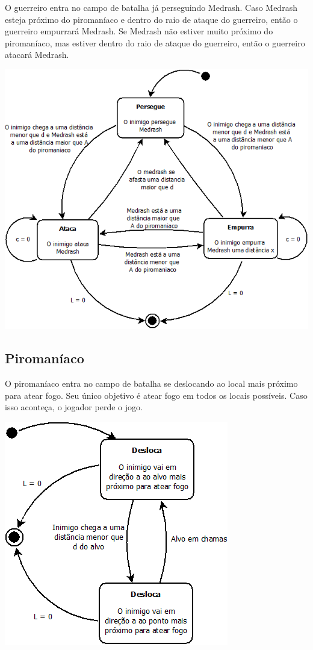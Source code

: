 O guerreiro entra no campo de batalha já perseguindo Medrash. Caso
Medrash esteja próximo do piromaníaco e dentro do raio de ataque do 
guerreiro, então o guerreiro empurrará Medrash.
Se Medrash não estiver muito próximo do piromaníaco, mas estiver dentro
do raio de ataque do guerreiro, então o guerreiro atacará Medrash.

\begin{center}
 \includegraphics[scale=0.5]{ia_guerreiro.png}
\end{center}

\subsection{Piromaníaco}

O piromaníaco entra no campo de batalha se deslocando ao local mais
próximo para atear fogo. Seu único objetivo é atear fogo em todos os
locais possíveis. Caso isso aconteça, o jogador perde o jogo.

\begin{center}
 \includegraphics[scale=0.5]{ia_piromaniaco.png}
\end{center}
